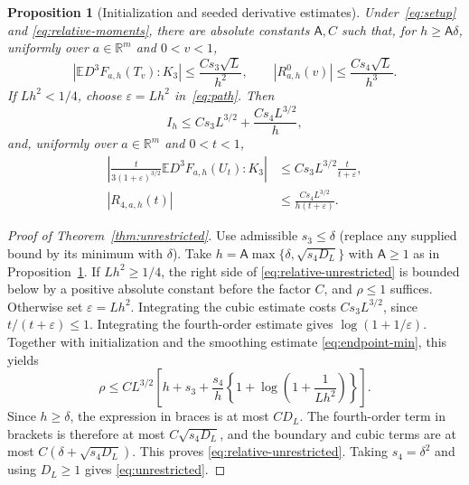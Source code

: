 \documentclass[11pt,letterpaper]{article}
\newtheorem{proposition}{Proposition}
\theoremstyle{remark}
\newcommand{\E}{\mathbb E}
\newcommand{\R}{\mathbb R}
\begin{document}
\begin{proposition}[Initialization and seeded derivative estimates]
\label{an:prop:derivative}
Under~\eqref{eq:setup} and \eqref{eq:relative-moments}, there are absolute constants \(\mathsf A,C\)
such that, for \(h\ge\mathsf A\delta\), uniformly over
\(a\in\R^m\) and \(0<v<1\),
\begin{equation}
 |\E D^3F_{a,h}(T_v):K_3|\le\frac{Cs_3\sqrt L}{h^2},
 \qquad |R^0_{a,h}(v)|\le\frac{Cs_4\sqrt L}{h^3}.
 \label{eq:direct-initialization}
\end{equation}
If \(Lh^2<1/4\), choose \(\varepsilon=Lh^2\) in~\eqref{eq:path}.
Then
\begin{equation}
 I_h\le Cs_3 L^{3/2}+\frac{Cs_4L^{3/2}}h,
 \label{eq:initialization-bound}
\end{equation}
and, uniformly over \(a\in\R^m\) and \(0<t<1\),
\begin{equation}
 \begin{aligned}
 \left|\frac{t}{3(1+\varepsilon)^{3/2}}
          \E D^3F_{a,h}(U_t):K_3\right|
 &\le Cs_3 L^{3/2}\frac{t}{t+\varepsilon},\\
 |R_{4,a,h}(t)|&\le\frac{Cs_4L^{3/2}}{h(t+\varepsilon)}.
 \end{aligned}
 \label{eq:seeded-derivatives}
\end{equation}

\end{proposition}
\begin{proof}[Proof of Theorem~\ref{thm:unrestricted}]
Use admissible $s_3\le\delta$ (replace any supplied bound by its minimum with $\delta$). Take $h=\mathsf A\max\{\delta,\sqrt{s_4D_L}\}$ with $\mathsf A\ge1$ as in Proposition~\ref{an:prop:derivative}. If $Lh^2\ge1/4$, the right side of \eqref{eq:relative-unrestricted} is bounded below by a positive absolute constant before the factor $C$, and $\rho\le1$ suffices. Otherwise set $\varepsilon=Lh^2$. Integrating the cubic estimate costs $Cs_3L^{3/2}$, since $t/(t+\varepsilon)\le1$. Integrating the fourth-order estimate gives $\log(1+1/\varepsilon)$. Together with initialization and the smoothing estimate \eqref{eq:endpoint-min}, this yields
\[
 \rho\le C L^{3/2}\left[h+s_3+
 \frac{s_4}{h}\left\{1+\log\!\left(1+\frac1{Lh^2}\right)\right\}\right].
\]
Since $h\ge\delta$, the expression in braces is at most $C D_L$. The fourth-order term in brackets is therefore at most $C\sqrt{s_4D_L}$, and the boundary and cubic terms are at most $C(\delta+\sqrt{s_4D_L})$. This proves \eqref{eq:relative-unrestricted}. Taking $s_4=\delta^2$ and using $D_L\ge1$ gives \eqref{eq:unrestricted}.
\end{proof}
\end{document}
